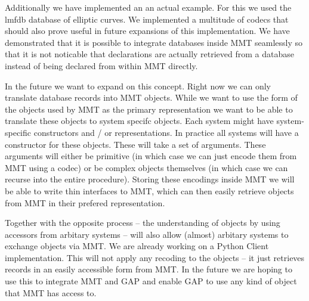 \documentclass{deliverablereport}
\begin{document}
Additionally we have implemented an an actual example. For this we used the lmfdb database of elliptic curves. We implemented a multitude of codecs that should also prove useful in future expansions of this implementation. We have demonstrated that it is possible to integrate databases inside MMT seamlessly so that it is not noticable that declarations are actually retrieved from a database instead of being declared from within MMT directly.

In the future we want to expand on this concept. Right now we can only translate database records into MMT objects. While we want to use the form of the objects used by MMT as the primary representation we want to be able to translate these objects to system specifc objects. Each system might have system-specific constructors and / or representations. In practice all systems will have a constructor for these objects. These will take a set of arguments. These arguments will either be primitive (in which case we can just encode them from MMT using a codec) or be complex objects themselves (in which case we can recurse into the entire procedure). Storing these encodings inside MMT we will be able to write thin interfaces to MMT, which can then easily retrieve objects from MMT in their prefered representation.

Together with the opposite process -- the understanding of objects by using accessors from arbitary systems -- will also allow (almost) arbitary systems to exchange objects via MMT. We are already working on a Python Client implementation. This will not apply any recoding to the objects -- it just retrieves records in an easily accessible form from MMT. In the future we are hoping to use this to integrate MMT and GAP and enable GAP to use any kind of object that MMT has access to.

\newpage\printbibliography
{}
\end{document}
